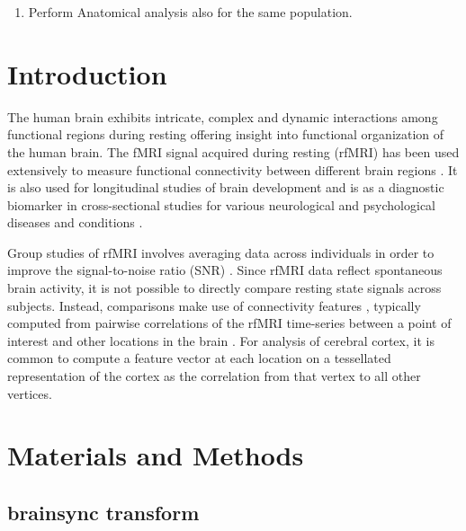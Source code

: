 \documentclass[preprint,12pt]{elsarticle}
\begin{document}
\begin{enumerate}
    \item Perform Anatomical analysis also for the same population.
    
\end{enumerate}

\section{Introduction}
\label{sec:introduction}
The human brain exhibits intricate, complex and dynamic interactions among functional regions during resting offering insight into functional organization of the human brain. The fMRI signal acquired during resting (rfMRI) has been used extensively to measure functional connectivity between different brain regions \citep{horwitz_elusive_2003,lang_resting-state_2014,smith_network_2011, smitha_resting_2017,van_den_heuvel_exploring_2010}. It is also used for longitudinal studies of brain development and is as a diagnostic biomarker in cross-sectional studies for various neurological and psychological diseases and conditions \cite{redcay_intrinsic_2013}. 

Group studies of rfMRI involves averaging data across individuals in order to improve the signal-to-noise ratio (SNR) \cite{dubois_building_2016}. 
Since rfMRI data reflect spontaneous brain activity, it is not possible to directly compare resting state signals across subjects. Instead, comparisons make use of connectivity features \cite{iraji_connectivity_2016}, typically computed from pairwise correlations of the rfMRI time-series between a point of interest and other locations in the brain \cite{fan_human_2016}. For analysis of cerebral cortex, it is common to compute a feature vector at each location on a tessellated representation of the cortex as the correlation from that vertex to all other vertices. 

\section{Materials and Methods}
\label{sec:mat_methods}
\subsection{brainsync transform}
\end{document}

